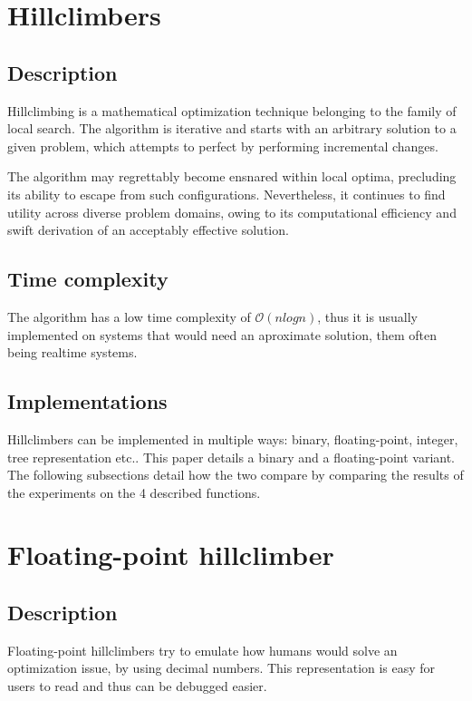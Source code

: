 \documentclass[conference]{IEEEtran}
\begin{document}
\section{Hillclimbers}

\subsection{Description}
Hillclimbing is a mathematical optimization technique belonging to the family of local search. The algorithm is iterative
and starts with an arbitrary solution to a given problem, which attempts to perfect by performing incremental changes.

The algorithm may regrettably become ensnared within local optima, precluding its ability to escape from such configurations.
Nevertheless, it continues to find utility across diverse problem domains, owing to its computational efficiency and swift
derivation of an acceptably effective solution.

\subsection{Time complexity}
The algorithm has a low time complexity of $\mathcal{O}(n log n)$, thus it is usually implemented on systems that would need an
aproximate solution, them often being realtime systems.

\subsection{Implementations}
Hillclimbers can be implemented in multiple ways: binary, floating-point, integer, tree representation etc..
This paper details a binary and a floating-point variant. The following subsections detail how the two compare by comparing
the results of the experiments on the 4 described functions.


\section{Floating-point hillclimber}

\subsection{Description}
Floating-point hillclimbers try to emulate how humans would solve an optimization issue, by using decimal numbers. This
representation is easy for users to read and thus can be debugged easier.
\end{document}
